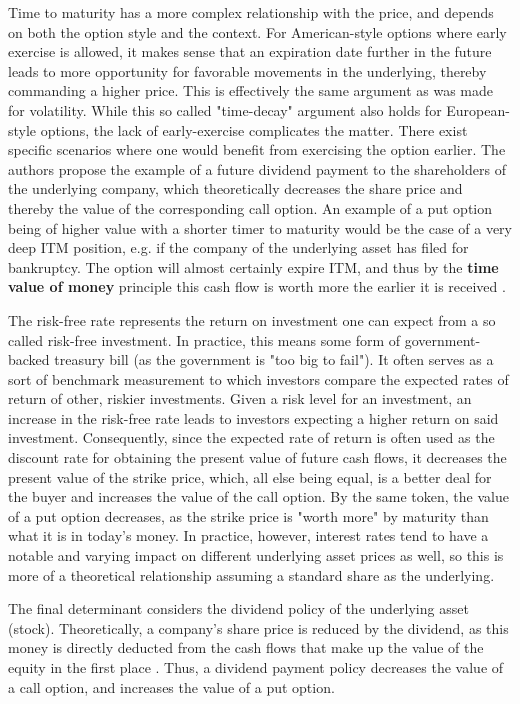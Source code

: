 \documentclass[english,12pt,a4paper,pdftex,sci,utf8]{aaltothesis}
\begin{document}
Time to maturity has a more complex relationship with the price, and depends on both the option style and the context. For American-style options where early exercise is allowed, it makes sense that an expiration date further in the future leads to more opportunity for favorable movements in the underlying, thereby commanding a higher price. This is effectively the same argument as was made for volatility. While this so called "time-decay" argument also holds for European-style options, the lack of early-exercise complicates the matter. There exist specific scenarios where one would benefit from exercising the option earlier. The authors propose the example of a future dividend payment to the shareholders of the underlying company, which theoretically decreases the share price and thereby the value of the corresponding call option. An example of a put option being of higher value with a shorter timer to maturity would be the case of a very deep ITM position, e.g. if the company of the underlying asset has filed for bankruptcy. The option will almost certainly expire ITM, and thus by the \textbf{time value of money} principle this cash flow is worth more the earlier it is received \cite[pp. 97-101]{berk2007corporate}.


The risk-free rate represents the return on investment one can expect from a so called risk-free investment. In practice, this means some form of government-backed treasury bill (as the government is "too big to fail"). It often serves as a sort of benchmark measurement to which investors compare the expected rates of return of other, riskier investments. Given a risk level for an investment, an increase in the risk-free rate leads to investors expecting a higher return on said investment. Consequently, since the expected rate of return is often used as the discount rate for obtaining the present value of future cash flows, it decreases the present value of the strike price, which, all else being equal, is a better deal for the buyer and increases the value of the call option. By the same token, the value of a put option decreases, as the strike price is "worth more" by maturity than what it is in today's money. In practice, however, interest rates tend to have a notable and varying impact on different underlying asset prices as well, so this is more of a theoretical relationship assuming a standard share as the underlying.

The final determinant considers the dividend policy of the underlying asset (stock). Theoretically, a company's share price is reduced by the dividend, as this money is directly deducted from the cash flows that make up the value of the equity in the first place \cite{modigliani1958cost}. Thus, a dividend payment policy decreases the value of a call option, and increases the value of a put option.
\end{document}
